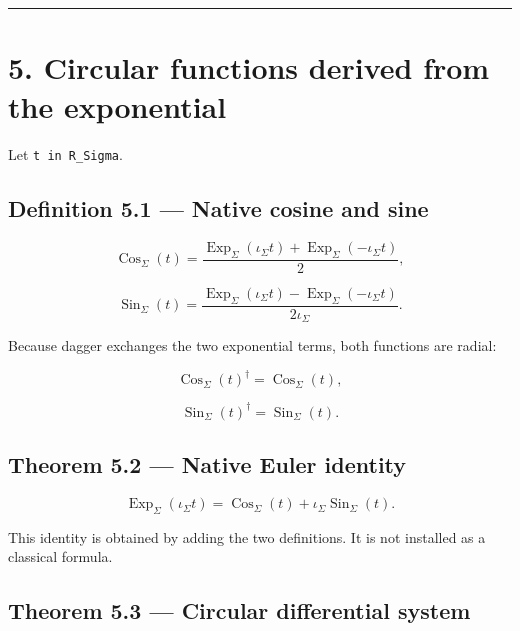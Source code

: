 \begin{center}\rule{0.5\linewidth}{0.5pt}\end{center}

\hypertarget{circular-functions-derived-from-the-exponential}{%
\section{5. Circular functions derived from the exponential}\label{circular-functions-derived-from-the-exponential}}

Let \texttt{t\ in\ R\_Sigma}.

\hypertarget{definition-5.1-native-cosine-and-sine}{%
\subsection{Definition 5.1 --- Native cosine and sine}\label{definition-5.1-native-cosine-and-sine}}

\[
\operatorname{Cos}_\Sigma(t)
=
\frac{
\operatorname{Exp}_\Sigma(\iota_\Sigma t)
+
\operatorname{Exp}_\Sigma(-\iota_\Sigma t)
}{2},
\]

\[
\operatorname{Sin}_\Sigma(t)
=
\frac{
\operatorname{Exp}_\Sigma(\iota_\Sigma t)
-
\operatorname{Exp}_\Sigma(-\iota_\Sigma t)
}{2\iota_\Sigma}.
\]

Because dagger exchanges the two exponential terms, both functions are radial:

\[
\operatorname{Cos}_\Sigma(t)^\dagger
=
\operatorname{Cos}_\Sigma(t),
\]

\[
\operatorname{Sin}_\Sigma(t)^\dagger
=
\operatorname{Sin}_\Sigma(t).
\]

\hypertarget{theorem-5.2-native-euler-identity}{%
\subsection{Theorem 5.2 --- Native Euler identity}\label{theorem-5.2-native-euler-identity}}

\[
\boxed{
\operatorname{Exp}_\Sigma(\iota_\Sigma t)
=
\operatorname{Cos}_\Sigma(t)
+
\iota_\Sigma\operatorname{Sin}_\Sigma(t).
}
\]

This identity is obtained by adding the two definitions. It is not installed as
a classical formula.

\hypertarget{theorem-5.3-circular-differential-system}{%
\subsection{Theorem 5.3 --- Circular differential system}\label{theorem-5.3-circular-differential-system}}

